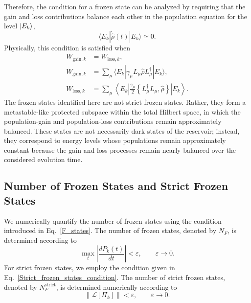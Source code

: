 \documentclass[aps,superscriptaddress,twocolumn,pre,longbibliography,floatfix]{revtex4-1}
\begin{document}
	Therefore, the condition for a frozen state can be analyzed by requiring that the gain and loss contributions balance each other in the population equation for the level $\ket{E_k}$,
	\begin{equation}
		\langle E_k | \dot{\hat{\rho}}(t) | E_k \rangle \simeq 0.
	\end{equation}
	Physically, this condition is satisfied when
	\begin{align}
		W_{\mathrm{gain},k} &= W_{\mathrm{loss},k},\\
		W_{\mathrm{gain},k} &= \sum_{\mu} \langle E_k | \gamma_{\mu} L_{\mu}\hat{\rho}L_{\mu}^{\dagger} | E_k \rangle,\\
		W_{\mathrm{loss},k} &= \sum_{\mu} \left\langle E_k \left| \frac{\gamma_{\mu}}{2}
		\left\{ L_{\mu}^{\dagger}L_{\mu}, \hat{\rho} \right\} \right| E_k \right\rangle .
	\end{align}
	The frozen states identified here are not strict frozen states. Rather, they form a metastable-like protected subspace within the total Hilbert space, in which the population-gain and population-loss contributions remain approximately balanced. These states are not necessarily dark states of the reservoir; instead, they correspond to energy levels whose populations remain approximately constant because the gain and loss processes remain nearly balanced over the considered evolution time.
	
	
	\subsection{Number of Frozen States and Strict Frozen States}
	We numerically quantify the number of frozen states using the condition introduced in Eq.~\eqref{F_states}. The number of frozen states, denoted by $N_F$, is determined according to
	\begin{equation}
		\max_t
		\left|
		\frac{dP_k(t)}{dt}
		\right|
		<
		\varepsilon,
		\qquad
		\varepsilon \rightarrow 0.
	\end{equation}
	For strict frozen states, we employ the condition given in Eq.~\eqref{Strict_frozen_states_condition}. The number of strict frozen states, denoted by $N_F^{\mathrm{strict}}$, is determined numerically according to
	\begin{equation}\label{strict_frozen}
		\left\|
		\mathcal{L}[\Pi_k]
		\right\|
		<
		\varepsilon,
		\qquad
		\varepsilon \rightarrow 0.
	\end{equation}
	
\end{document}
